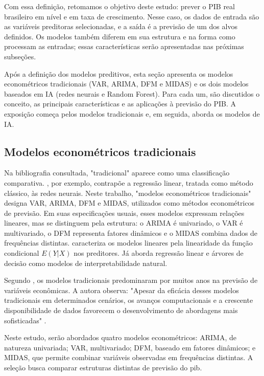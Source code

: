 Com essa definição, retomamos o objetivo deste estudo: prever o PIB real brasileiro em nível e em taxa de crescimento. Nesse caso, os dados de entrada são as variáveis preditoras selecionadas, e a saída é a previsão de um dos alvos definidos. Os modelos também diferem em sua estrutura e na forma como processam as entradas; essas características serão apresentadas nas próximas subseções.

Após a definição dos modelos preditivos, esta seção apresenta os modelos econométricos tradicionais (VAR, ARIMA, DFM e MIDAS) e os dois modelos baseados em IA (redes neurais e Random Forest). Para cada um, são discutidos o conceito, as principais características e as aplicações à previsão do PIB. A exposição começa pelos modelos tradicionais e, em seguida, aborda os modelos de IA.

\subsection{Modelos econométricos tradicionais}

Na bibliografia consultada, "tradicional" aparece como uma classificação comparativa. , por exemplo, contrapõe a regressão linear, tratada como método clássico, às redes neurais. Neste trabalho, "modelos econométricos tradicionais" designa VAR, ARIMA, DFM e MIDAS, utilizados como métodos econométricos de previsão. Em suas especificações usuais, esses modelos expressam relações lineares, mas se distinguem pela estrutura: o ARIMA é univariado, o VAR é multivariado, o DFM representa fatores dinâmicos e o MIDAS combina dados de frequências distintas.  caracteriza os modelos lineares pela linearidade da função condicional $E(Y|X)$ nos preditores. Já  aborda regressão linear e árvores de decisão como modelos de interpretabilidade natural.

Segundo , os modelos tradicionais predominaram por muitos anos na previsão de variáveis econômicas. A autora observa: "Apesar da eficácia desses modelos tradicionais em determinados cenários, os avanços computacionais e a crescente disponibilidade de dados favorecem o desenvolvimento de abordagens mais sofisticadas" .

Neste estudo, serão abordados quatro modelos econométricos: ARIMA, de natureza univariada; VAR, multivariado; DFM, baseado em fatores dinâmicos; e MIDAS, que permite combinar variáveis observadas em frequências distintas. A seleção busca comparar estruturas distintas de previsão do \ac{pib}.

